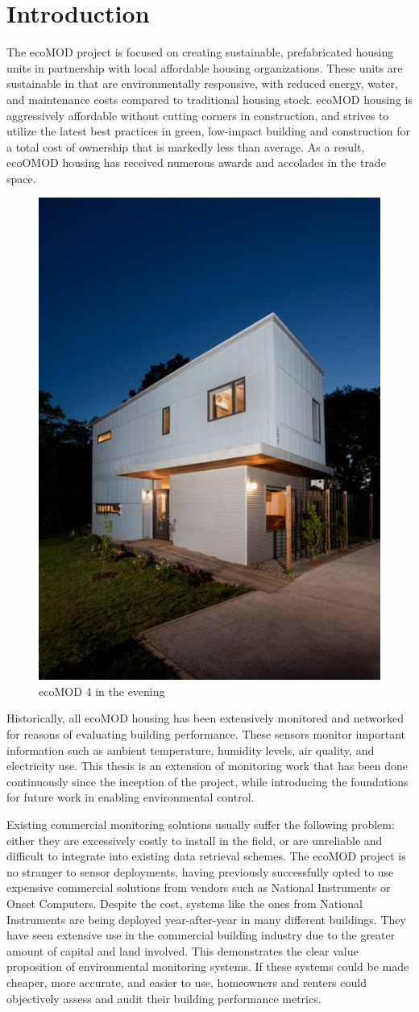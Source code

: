 \chapter{Introduction}

The ecoMOD project is focused on creating sustainable, prefabricated housing units in partnership with local affordable housing organizations. These units are sustainable in that are environmentally responsive, with reduced energy, water, and maintenance costs compared to traditional housing stock. ecoMOD housing is aggressively affordable without cutting corners in construction, and strives to utilize the latest best practices in green, low-impact building and construction for a total cost of ownership that is markedly less than average. As a result, ecoOMOD housing has received numerous awards and accolades in the trade space\cite{Lau2013}.

\begin{figure}
\centering
\includegraphics[width=0.3\linewidth]{./images/SFSmith_110602_8113-copy-500x705}
\caption{ecoMOD 4 in the evening\cite{Smith2011}}
\label{fig:SFSmith_110602_8113-copy-500x705}
\end{figure}

Historically, all ecoMOD housing has been extensively monitored and networked for reasons of evaluating building performance. These sensors monitor important information such as ambient temperature, humidity levels, air quality, and electricity use. This thesis is an extension of monitoring work that has been done continuously since the inception of the project, while introducing the foundations for future work in enabling environmental control. 

Existing commercial monitoring solutions usually suffer the following problem: either they are excessively costly to install in the field, or are unreliable and difficult to integrate into existing data retrieval schemes. The ecoMOD project is no stranger to sensor deployments, having previously successfully opted to use expensive commercial solutions from vendors such as National Instruments or Onset Computers. Despite the cost, systems like the ones from National Instruments are being deployed year-after-year in many different buildings. They have seen extensive use in the commercial building industry due to the greater amount of capital and land involved. This demonstrates the clear value proposition of environmental monitoring systems. If these systems could be made cheaper, more accurate, and easier to use, homeowners and renters could objectively assess and audit their building performance metrics.

